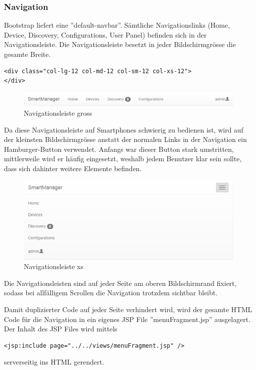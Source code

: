 \subsubsection{Navigation}
Bootstrap liefert eine ''default-navbar''. Sämtliche Navigationslinks (Home, Device, Discovery, Configurations, User Panel) befinden sich in der Navigationsleiste. Die Navigationsleiste besetzt in jeder Bildschirmgrösse die gesamte Breite.
\begin{lstlisting}[language=html5]
<div class="col-lg-12 col-md-12 col-sm-12 col-xs-12">
</div>
\end{lstlisting}
\begin{figure}[H]
\centering
\includegraphics[scale=0.8]{../04_Realisierung/images/userinterface/navbar_lg.png}
\caption{Navigationsleiste gross}
\end{figure}

Da diese Navigationsleiste auf Smartphones schwierig zu bedienen ist, wird auf der kleinsten Bildschirmgrösse anstatt der normalen Links in der Navigation ein Hamburger-Button verwendet. Anfangs war dieser Button stark umstritten, mittlerweile wird er häufig eingesetzt, weshalb jedem Benutzer klar sein sollte, dass sich dahinter weitere Elemente befinden.
\begin{figure}[H]
\centering
\includegraphics[scale=0.87]{../04_Realisierung/images/userinterface/navbar_xs.png}
\caption{Navigationsleiste xs}
\end{figure}

Die Navigationsleisten sind auf jeder Seite am oberen Bildschirmrand fixiert, sodass bei allfälligem Scrollen die Navigation trotzdem sichtbar bleibt.

Damit duplizierter Code auf jeder Seite verhindert wird, wird der gesamte HTML Code für die Navigation in ein eigenes JSP File ''menuFragment.jsp'' ausgelagert. Der Inhalt des JSP Files wird mittels 
\begin{lstlisting}[language=html5]
<jsp:include page="../../views/menuFragment.jsp" />
\end{lstlisting}
serverseitig ins HTML gerendert.
